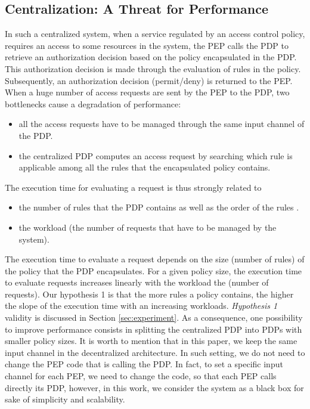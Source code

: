 \subsection{Centralization: A Threat for Performance}
In such a centralized system, when a service regulated by an access control policy, requires an access to some resources in the system, the PEP calls the PDP to 
retrieve an authorization decision based on the policy encapsulated in the PDP. This authorization decision is made through the evaluation of rules in the policy. 
Subsequently, an authorization decision (permit/deny) is returned to the PEP. When a huge number of access requests are sent by the PEP to the PDP, two bottlenecks cause a degradation of performance:
\begin{itemize}
 \item all the access requests have to be managed through the same input channel of the PDP. 
 \item the centralized PDP computes an access request by searching which rule is applicable among all the rules that the encapsulated policy contains.
\end{itemize}

The execution time for evaluating a request is thus strongly related to
\begin{itemize} 
\item the number of rules that the PDP contains as well as the order of the rules \cite{clustering}.
\item the workload (the number of requests that have to be managed by the system).
\end{itemize}
The execution time to evaluate a request depends on the size (number of rules) of the policy that the PDP encapsulates. For a given policy size, the execution time  to evaluate
 requests increases linearly with the workload the (number of requests). 
Our hypothesis 1 is that the more rules a policy contains, the higher the slope of the execution time with an increasing workloads. 
 \textit{Hypothesis 1} validity is discussed in Section \ref{sec:experiment}.
As a consequence, one possibility to improve performance consists in splitting the centralized PDP into PDPs with smaller policy sizes. 
It is worth to mention that in this paper, we keep the same input channel in the decentralized architecture. In such setting, we do not need to change the PEP code that is calling 
the PDP. In fact, to set a specific input channel for each PEP, we need to change the code, so that each PEP calls directly its PDP, however, in this work, we consider the system as
 a black box for sake of simplicity and scalability.  


